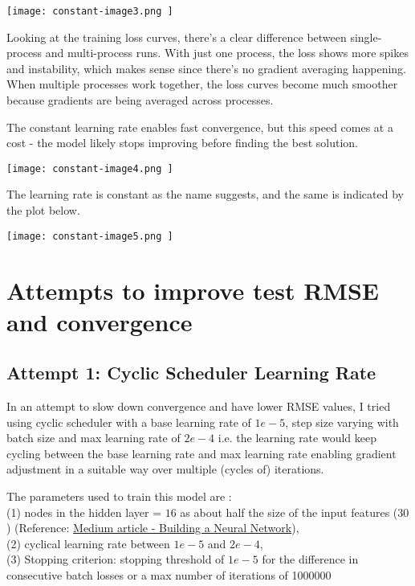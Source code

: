 \documentclass{article}
\begin{document}
\begin{center}
\texttt{[image: constant-image3.png ]}
\end{center}

Looking at the training loss curves, there's a clear difference between single-process and multi-process runs. With just one process, the loss shows more spikes and instability, which makes sense since there's no gradient averaging happening. When multiple processes work together, the loss curves become much smoother because gradients are being averaged across processes.

The constant learning rate enables fast convergence, but this speed comes at a cost - the model likely stops improving before finding the best solution.

\begin{center}
\texttt{[image: constant-image4.png ]}
\end{center}

The learning rate is constant as the name suggests, and the same is indicated by the plot below.

\begin{center}
\texttt{[image: constant-image5.png ]}
\end{center}

\section{Attempts to improve test RMSE and convergence}

\subsection {Attempt 1: Cyclic Scheduler Learning Rate }
In an attempt to slow down convergence and have lower RMSE values, I tried using cyclic scheduler with a base learning rate of $1e-5$, step size varying with batch size and max learning rate of $2e-4$ i.e. the learning rate would keep cycling between the base learning rate and max learning rate enabling gradient adjustment in a suitable way over multiple (cycles of) iterations.

The parameters used to train this model are : \\
(1) nodes in the hidden layer = $16$ as about half the size of the input features ($30$) (Reference: \href{https://medium.com/data-science/17-rules-of-thumb-for-building-a-neural-network-93356f9930af}{Medium article - Building a Neural Network}), \\
(2) cyclical learning rate between $1e-5$ and $2e-4$, \\
(3) Stopping criterion: stopping threshold of $1e-5$ for the difference in consecutive batch losses or a max number of iterations of 1000000 \\
\end{document}
